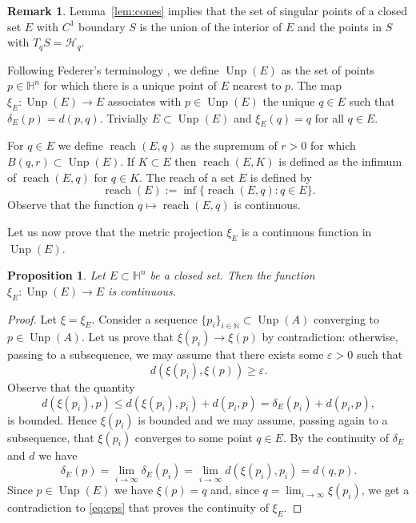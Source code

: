 \documentclass[10pt]{amsart}
\newtheorem{proposition}[theorem]{Proposition}
\theoremstyle{definition}
\newtheorem{remark}[theorem]{Remark}
\theoremstyle{remark}
\numberwithin{equation}{section}
\begin{document}
\begin{remark}
Lemma~\ref{lem:cones} implies that the set of singular points of a closed set $E$ with $C^1$ boundary $S$ is the union of the interior of $E$ and the points in $S$ with $T_qS={\mathcal{H}}_q$.
\end{remark}

Following Federer's terminology \cite{MR0110078}, we define $\operatorname{Unp}(E)$ as the set of points $p\in{{\mathbb{H}}}^n$ for which there is a unique point of $E$ nearest to $p$. The map $\xi_{E}:\operatorname{Unp}(E)\to E$ associates with $p\in\operatorname{Unp}(E)$ the unique $q\in E$ such that ${\delta_{E}}(p)=d(p,q)$. Trivially $E\subset\operatorname{Unp}(E)$ and $\xi_E(q)=q$ for all $q\in E$.

For $q\in E$ we define $\operatorname{reach}(E,q)$ as the supremum of $r>0$ for which $B(q,r)\subset\operatorname{Unp}(E)$.  If $K\subset E$ then $\operatorname{reach}(E,K)$ is defined as the  infimum of $\operatorname{reach}(E,q)$ for $q\in K$. The reach of a set $E$ is defined by
\[
\operatorname{reach}(E):=\inf\{\operatorname{reach}(E,q) : q\in E\}.
\]
Observe that the function $q\mapsto \operatorname{reach}(E,q)$ is continuous.

Let us now prove that the metric projection $\xi_E$ is a continuous function in $\operatorname{Unp}(E)$.

\begin{proposition}
\label{prop:xicont}
Let $E\subset{{\mathbb{H}}}^n$ be a closed set. Then the function $\xi_E:\operatorname{Unp}(E)\to E$ is continuous.
\end{proposition}

\begin{proof}
Let $\xi=\xi_E$.  Consider a sequence $\{p_{i}\}_{i\in{{\mathbb{N}}}}\subset\operatorname{Unp}(A)$ converging to $p\in\operatorname{Unp}(A)$. Let us prove that $\xi(p_{i})\to \xi(p)$ by contradiction: otherwise, passing to a subsequence, we may assume that there exists some ${\varepsilon}>0$ such that
\begin{equation}
\label{eq:eps}
d(\xi(p_{i}),\xi(p)){\geqslant}{\varepsilon}.
\end{equation}
Observe that the quantity
\[
d(\xi(p_{i}),p){\leqslant} d(\xi(p_{i}),p_{i})+d(p_{i},p)=\delta_{E}(p_{i})+
d(p_{i},p),
\]
is bounded. Hence $\xi(p_{i})$ is bounded and we may assume, passing again to a subsequence, that $\xi(p_i)$ converges to some point $q\in E$. By the continuity of $\delta_{E}$ and $d$ we have
\[
\delta_{E}(p)=\lim_{i\to\infty} \delta_{E}(p_{i})=\lim_{i\to\infty}
d(\xi(p_{i}),p_{i})=d(q,p).
\]
Since $p\in\operatorname{Unp}(E)$ we have $\xi(p)=q$ and, since $q=\lim_{i\to\infty}\xi(p_{i})$, we get a contradiction to \eqref{eq:eps} that proves the continuity of $\xi_E$.
\end{proof}
\end{document}
